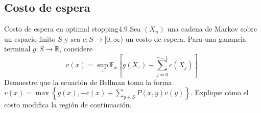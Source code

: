 \documentclass[10pt,a4paper]{article}
\begin{document}
\newpage
\subsection{Costo de espera}

\begin{ejercicio}{Costo de espera en optimal stopping}{4.9}
    Sea $(X_n)$ una cadena de Markov sobre un espacio finito $S$ y sea $c: S \to [0,\infty)$ un costo de espera. Para una ganancia terminal $g: S \to \mathbb{R}$, considere
    \[ v(x) = \sup_\tau \mathbb{E}_x \left[ g(X_\tau) - \sum_{j=0}^{\tau-1} c(X_j) \right]. \]
    Demuestre que la ecuación de Bellman toma la forma $v(x) = \max \left\{ g(x), -c(x) + \sum_{y \in S} P(x,y)v(y) \right\}$. Explique cómo el costo modifica la región de continuación.
\end{ejercicio}
\end{document}
